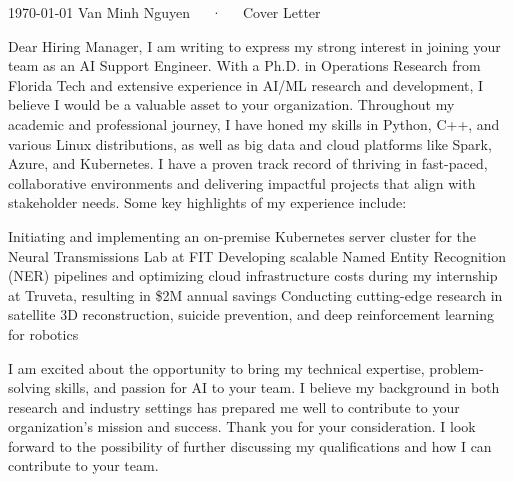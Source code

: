 \documentclass[11pt, letterpaper]{awesome-cv}
\begin{document}
\makecvheader[R]

\makecvfooter
  {\today}
  {Van Minh Nguyen~~~·~~~Cover Letter}
  {}

\makelettertitle

\begin{cvletter}

    Dear Hiring Manager,
    I am writing to express my strong interest in joining your team as an AI Support Engineer. With a Ph.D. in Operations Research from Florida Tech and extensive experience in AI/ML research and development, I believe I would be a valuable asset to your organization.
    Throughout my academic and professional journey, I have honed my skills in Python, C++, and various Linux distributions, as well as big data and cloud platforms like Spark, Azure, and Kubernetes. I have a proven track record of thriving in fast-paced, collaborative environments and delivering impactful projects that align with stakeholder needs.
    Some key highlights of my experience include:
    
    Initiating and implementing an on-premise Kubernetes server cluster for the Neural Transmissions Lab at FIT
    Developing scalable Named Entity Recognition (NER) pipelines and optimizing cloud infrastructure costs during my internship at Truveta, resulting in \$2M annual savings
    Conducting cutting-edge research in satellite 3D reconstruction, suicide prevention, and deep reinforcement learning for robotics
    
    I am excited about the opportunity to bring my technical expertise, problem-solving skills, and passion for AI to your team. I believe my background in both research and industry settings has prepared me well to contribute to your organization's mission and success.
    Thank you for your consideration. I look forward to the possibility of further discussing my qualifications and how I can contribute to your team.

\end{cvletter}


\makeletterclosing
\end{document}
